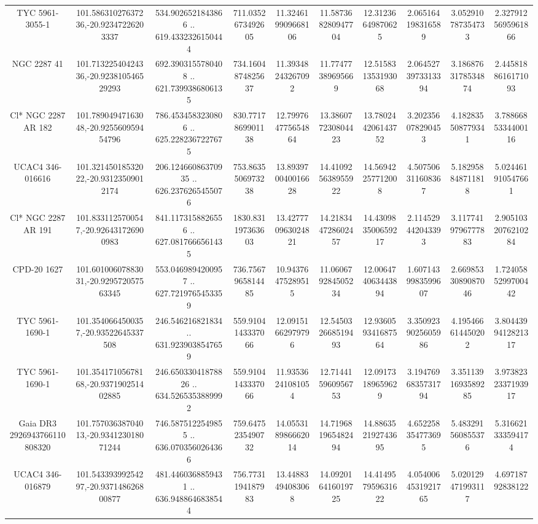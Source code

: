 \begin{table}
\begin{tabular}{cccccccccc}
TYC 5961-3055-1 & 101.58631027637236,-20.92347226203337 & 534.9026521843866 .. 619.4332326150444 & 711.0352673492605 & 11.324619909668106 & 11.587368280947704 & 12.31236649870625 & 2.065164198316589 & 3.052910787354733 & 2.3279125695961866 \\
NGC  2287    41 & 101.71322540424336,-20.923810546529293 & 692.3903155780408 .. 621.7399386806135 & 734.1604874825637 & 11.39348243267092 & 11.77477389695669 & 12.515831353193068 & 2.0645273973313394 & 3.1868763178534874 & 2.4458188616171093 \\
Cl* NGC 2287     AR     182 & 101.78904947163048,-20.925560959454796 & 786.4534583230806 .. 625.2282367227675 & 830.7717869901138 & 12.799764775654864 & 13.386077230804423 & 13.780244206143752 & 3.202356078290453 & 4.182835508779341 & 3.7886685334400116 \\
UCAC4 346-016616 & 101.32145018532022,-20.93123509012174 & 206.12466086370935 .. 626.2376265455076 & 753.8635506973238 & 13.893970040016628 & 14.410925638955922 & 14.56942257712008 & 4.507506311608367 & 5.182958848711818 & 5.024461910547661 \\
Cl* NGC 2287     AR     191 & 101.8331125700547,-20.926431726900983 & 841.1173158826556 .. 627.0817666561435 & 1830.831197363603 & 13.427770963024821 & 14.218344728602457 & 14.430983500659217 & 2.114529442043393 & 3.1177419796777883 & 2.9051032076210284 \\
CPD-20  1627 & 101.60100607883031,-20.929572057563345 & 553.0469894200957 .. 627.7219765453359 & 736.7567965814485 & 10.94376475289515 & 11.060679284505234 & 12.006474063443894 & 1.6071439983599607 & 2.6698533089087046 & 1.7240585299700442 \\
TYC 5961-1690-1 & 101.3540664500357,-20.93522645337508 & 246.546216821834 .. 631.9239038547659 & 559.9104143337066 & 12.09151662979796 & 12.545032668519493 & 12.936059341687564 & 3.3509239025605986 & 4.195466614450202 & 3.8044399412821317 \\
TYC 5961-1690-1 & 101.35417105678168,-20.937190251402885 & 246.65033041878826 .. 634.5265353889992 & 559.9104143337066 & 11.93536241081054 & 12.714415960956753 & 12.09173189659629 & 3.1947696835731794 & 3.3511391693589285 & 3.9738232337193917 \\
Gaia DR3 2926943766110808320 & 101.75703638704013,-20.934123018071244 & 746.5875122549855 .. 636.0703560264366 & 759.6475235490732 & 14.055318986662014 & 14.719681965482494 & 14.886352192743695 & 4.652258354773695 & 5.483291560855376 & 5.316621333594174 \\
UCAC4 346-016879 & 101.54339399254297,-20.937148626800877 & 481.4460368859431 .. 636.9488646838544 & 756.7731194187983 & 13.44883494083068 & 14.092016416019725 & 14.414957959631622 & 4.0540064531921765 & 5.020129471993117 & 4.69718792838122 \\

\end{tabular}
\end{table}
